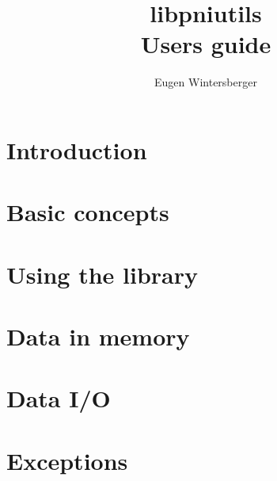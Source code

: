 \documentclass[a4paper,twoside]{book}
\author{Eugen Wintersberger}
\title{{\Huge libpniutils\\ Users guide}}
\begin{document}
\maketitle
\tableofcontents

\chapter{Introduction}\label{chapter:introduction}


\chapter{Basic concepts}\label{chapter:basics}


\chapter{Using the library}\label{chapter:usage}


\chapter{Data in memory}\label{chapter:data_in_memory}

\chapter{Data I/O}\label{chapter:io}

\chapter{Exceptions}\label{chapter:exceptions}
\end{document}
